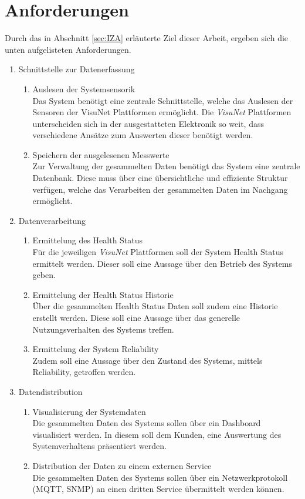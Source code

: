 \section{Anforderungen}
Durch das in Abschnitt \ref{sec:IZA} erläuterte Ziel dieser Arbeit, ergeben sich die unten aufgelisteten Anforderungen.
\begin{enumerate}
    \item Schnittstelle zur Datenerfassung
    \begin{enumerate}
        \item Auslesen der Systemsensorik\\
        Das System benötigt eine zentrale Schnittstelle, welche das Auslesen der Sensoren der VisuNet Plattformen ermöglicht. Die \textit{VisuNet} Plattformen unterscheiden sich in der ausgestatteten Elektronik so weit, dass verschiedene Ansätze zum Auswerten dieser benötigt werden. 
        \item Speichern der ausgelesenen Messwerte\\
        Zur Verwaltung der gesammelten Daten benötigt das System eine zentrale Datenbank. Diese muss über eine übersichtliche und effiziente Struktur verfügen, welche das Verarbeiten der gesammelten Daten im Nachgang ermöglicht.
    \end{enumerate}
    
    \item Datenverarbeitung
    \begin{enumerate}
        \item Ermittelung des Health Status\\
        Für die jeweiligen \textit{VisuNet} Plattformen soll der System Health Status ermittelt werden. Dieser soll eine Aussage über den Betrieb des Systems geben. 
        \item Ermittelung der Health Status Historie\\
        Über die gesammelten Health Status Daten soll zudem eine Historie erstellt werden. Diese soll eine Aussage über das generelle Nutzungsverhalten des Systems treffen. 
        \item Ermittelung der System Reliability\\
        Zudem soll eine Aussage über den Zustand des Systems, mittels Reliability, getroffen werden. 
    \end{enumerate}

    \item Datendistribution
    \begin{enumerate}
        \item Visualisierung der Systemdaten\\
        Die gesammelten Daten des Systems sollen über ein Dashboard visualisiert werden. In diesem soll dem Kunden, eine Auswertung des Systemverhaltens präsentiert werden. 
        \item Distribution der Daten zu einem externen Service\\
        Die gesammelten Daten des Systems sollen über ein Netzwerkprotokoll (MQTT, SNMP) an einen dritten Service übermittelt werden können.
    \end{enumerate}

   \end{enumerate}

